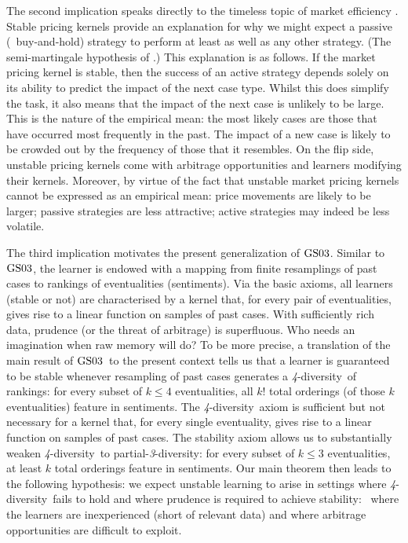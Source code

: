 \documentclass[12pt,a4paper,twoside]{article}
\newcommand{\gsii}{$\textup{GS03}$}
\newcommand{\parthreediv}{\textup{partial-\textit{3}-diversity}}
\newcommand{\fourdiv}{\textit{4}-\textup{diversity}}
\begin{document}
 
The second implication speaks directly to the timeless topic of market
efficiency \citet{fama1970efficient,malkiel2003efficient}.  Stable pricing
kernels provide an explanation for why we might expect a passive (\ie\
buy-and-hold) strategy to perform at least as well as any other strategy.  (The
semi-martingale hypothesis of \citet{fama1970efficient}.) This explanation is
as follows. If the market pricing kernel is stable, then the success of an
active strategy depends solely on its ability to predict the impact of the next
case type.  Whilst this does simplify the task, it also means that the impact
of the next case is unlikely to be large. This is the nature of the empirical
mean: the most likely cases are those that have occurred most frequently in the
past. The impact of a new case is likely to be crowded out by the frequency of
those that it resembles.  On the flip side, unstable pricing kernels come with
arbitrage opportunities and learners modifying their kernels.  Moreover, by
virtue of the fact that unstable market pricing kernels cannot be expressed as
an empirical mean: price movements are likely to be larger; passive strategies
are less attractive; active strategies may indeed be less volatile.

The third implication motivates the present {generalization} of \gsii. Similar to
\gsii, the learner is endowed with a mapping from finite resamplings of past
cases to rankings of eventualities (sentiments).  Via the basic axioms, all
learners (stable or not) are characterised by a kernel that, for every pair of
eventualities, gives rise to a linear function on samples of past cases.
With sufficiently rich data, prudence (or the threat of arbitrage) is
superfluous. Who needs an imagination when raw memory will do? To be more
precise, a translation of the main result of \gsii\ to the present context
tells us that a learner is guaranteed to be stable whenever resampling of past
cases generates a \fourdiv\ of rankings: for every subset of $k \leq 4$
eventualities, all $k!$ total orderings (of those $k$ eventualities) feature in
{sentiments}.  The \fourdiv\ axiom is sufficient but not necessary for
a kernel that, for every single eventuality, gives rise to a linear function on
samples of past cases. The stability axiom allows us to substantially weaken
\fourdiv\ to \parthreediv: for every subset of $k \leq 3$ eventualities, at
least $k$ total orderings feature in {sentiments}. Our main theorem then
leads to the following hypothesis: we expect unstable learning to arise in
settings where \fourdiv\ fails to hold and where prudence is required to
achieve stability: \ie\ where the learners are inexperienced (short of
relevant data) and where arbitrage opportunities are difficult to exploit.
\end{document}
